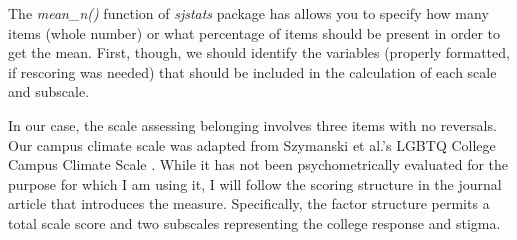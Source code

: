 \documentclass[
  english,
]{book}
\begin{document}
The \emph{mean\_n()} function of \emph{sjstats} package has allows you to specify how many items (whole number) or what percentage of items should be present in order to get the mean. First, though, we should identify the variables (properly formatted, if rescoring was needed) that should be included in the calculation of each scale and subscale.

In our case, the scale assessing belonging \citep{bollen_perceived_1990, hurtado_effects_1997} involves three items with no reversals. Our campus climate scale was adapted from Szymanski et al.'s LGBTQ College Campus Climate Scale \citep{szymanski_perceptions_2020}. While it has not been psychometrically evaluated for the purpose for which I am using it, I will follow the scoring structure in the journal article that introduces the measure. Specifically, the factor structure permits a total scale score and two subscales representing the college response and stigma.
\end{document}
